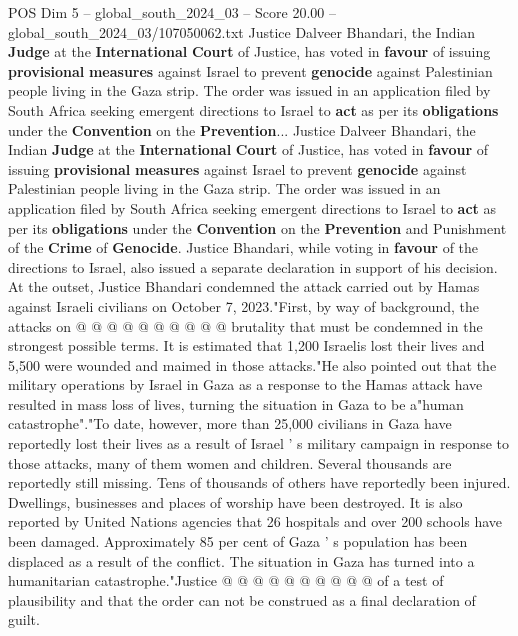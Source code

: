 \begin{textsample}{POS Dim 5 – global\_south\_2024\_03 – Score 20.00 – global\_south\_2024\_03/107050062.txt}  \label{ex:f5_pos_141}
Justice Dalveer Bhandari, the Indian \textbf{Judge} at the \textbf{International} \textbf{Court} of Justice, has voted in \textbf{favour} of issuing \textbf{provisional} \textbf{measures} against Israel to prevent \textbf{genocide} against Palestinian people living in the Gaza strip.
The order was issued in an application filed by South Africa seeking emergent directions to Israel to \textbf{act} as per its \textbf{obligations} under the \textbf{Convention} on the \textbf{Prevention}...
Justice Dalveer Bhandari, the Indian \textbf{Judge} at the \textbf{International} \textbf{Court} of Justice, has voted in \textbf{favour} of issuing \textbf{provisional} \textbf{measures} against Israel to prevent \textbf{genocide} against Palestinian people living in the Gaza strip.
The order was issued in an application filed by South Africa seeking emergent directions to Israel to \textbf{act} as per its \textbf{obligations} under the \textbf{Convention} on the \textbf{Prevention} and Punishment of the \textbf{Crime} of \textbf{Genocide}.
Justice Bhandari, while voting in \textbf{favour} of the directions to Israel, also issued a separate declaration in support of his decision.
At the outset, Justice Bhandari condemned the attack carried out by Hamas against Israeli civilians on October 7, 2023."First, by way of background, the attacks on @ @ @ @ @ @ @ @ @ @ brutality that must be condemned in the strongest possible terms.
It is estimated that 1,200 Israelis lost their lives and 5,500 were wounded and maimed in those attacks."He also pointed out that the military operations by Israel in Gaza as a response to the Hamas attack have resulted in mass loss of lives, turning the situation in Gaza to be a"human catastrophe"."To date, however, more than 25,000 civilians in Gaza have reportedly lost their lives as a result of Israel ' s military campaign in response to those attacks, many of them women and children.
Several thousands are reportedly still missing.
Tens of thousands of others have reportedly been injured.
Dwellings, businesses and places of worship have been destroyed.
It is also reported by United Nations agencies that 26 hospitals and over 200 schools have been damaged.
Approximately 85 per cent of Gaza ' s population has been displaced as a result of the conflict.
The situation in Gaza has turned into a humanitarian catastrophe."Justice @ @ @ @ @ @ @ @ @ @ of a test of plausibility and that the order can not be construed as a final declaration of guilt.

\end{textsample}
